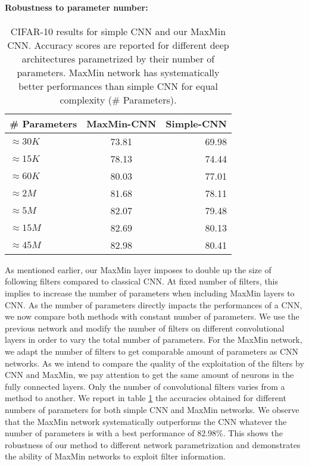 \documentclass{article}
\begin{document}
\paragraph*{Robustness to parameter number:}
\begin{table}
\begin{center}
\begin{tabular}{|l|c|r|}
   \hline
   \# Parameters & MaxMin-CNN & Simple-CNN \\
   \hline
	  $ \approx 30K$ & 73.81 & 69.98 \\
   \hline
      $ \approx 15K$ & 78.13 & 74.44 \\
   \hline
      $ \approx 60K$ & 80.03 & 77.01 \\
   \hline
      $ \approx 2M$  & 81.68 & 78.11 \\
   \hline
      $ \approx 5M$  & 82.07 & 79.48 \\
   \hline   
      $ \approx 15M$ & 82.69 & 80.13 \\
   \hline 
      $ \approx 45M$ & 82.98 & 80.41 \\
   \hline 
\end{tabular}
\caption{CIFAR-10 results for simple CNN and our MaxMin CNN. Accuracy scores are reported for different deep architectures parametrized by their number of parameters. MaxMin network has systematically better performances than simple CNN for equal complexity (\# Parameters).}
\label{resultscifar1}
\end{center}
\end{table}
As mentioned earlier, our MaxMin layer imposes to double up the size of following filters compared to classical CNN. At fixed number of filters, this  implies to increase the number of parameters when including MaxMin layers to CNN. As the number of parameters directly impacts the performances of a CNN, we now compare both methods with constant number of parameters. We  use the previous network and modify the number of filters on different convolutional layers in order to vary the total number of parameters. For the MaxMin network, we adapt the number of filters to get comparable amount of parameters as CNN networks. As we intend to compare the quality of the exploitation of the filters by CNN and MaxMin, we pay attention to get the same amount of neurons in the fully connected layers. Only the number of convolutional filters varies from a method to another.
We report in table \ref{resultscifar1} the accuracies obtained for different numbers of parameters for both simple CNN and MaxMin networks.
We observe that the MaxMin network systematically outperforms the CNN whatever the number of parameters is with a best performance of 82.98\%. This shows the robustness of our method to different network parametrization and demonstrates the ability of MaxMin networks to exploit filter information.
\end{document}
